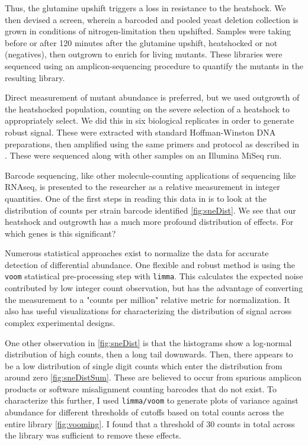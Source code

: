 Thus, the glutamine upshift triggers a loss in resistance to the
heatshock. We then devised a screen, wherein a barcoded 
and pooled yeast deletion collection
is grown in conditions of nitrogen-limitation then upshifted.
Samples were taking before or 
after 120 minutes after the glutamine upshift,
heatshocked or not (negatives),
then outgrown to enrich for living mutants.
These libraries were sequenced using an amplicon-sequencing procedure
to quantify the mutants in the resulting library.

Direct measurement of mutant abundance is preferred, but we used
outgrowth of the heatshocked population, counting on the severe
selection of a heatshock to appropriately select.
We did this in six biological replicates in order to generate robust
signal.
These were extracted with standard Hoffman-Winston DNA preparations,
then amplified using the same primers and protocol as described in
\parencite{robinson2014design}. These were sequenced along with other
samples on an Illumina MiSeq run.

Barcode sequencing, like other molecule-counting applications of
sequencing like RNAseq, is presented to the researcher as a relative 
measurement in integer quantities. 
One of the first steps in reading this data in is to look at the
distribution of counts per strain barcode identified
\autoref{fig:sneDist}.
We see that our heatshock and outgrowth has a much more profound
distribution of effects.
For which genes is this significant?


Numerous statistical approaches
exist to normalize the data for accurate detection of differential
abundance. One flexible and robust method is using the \texttt{voom}
statistical pre-processing step with \texttt{limma}. 
This calculates
the expected noise contributed by low integer count observation, but
has the advantage of converting the measurement to a "counts per
million" relative metric for normalization. 
It also has useful visualizations for characterizing the 
distribution of signal across complex experimental designs.

One other observation in \autoref{fig:sneDist} is that the histograms
show a log-normal distribution of high counts, then a long tail
downwards. 
Then, there appears to be a low distribution of single digit counts
which enter the distribution from around zero \autoref{fig:sneDistSum}.
These are believed to occur from spurious amplicon products or
software misalignment counting barcodes that do not exist.
To characterize this further, I used \texttt{limma/voom} to generate
plots of variance against abundance for different thresholds of
cutoffs based on total counts across the entire library
\autoref{fig:vooming}.
I found that a threshold of 30 counts in total across the library
was sufficient to remove these effects.

